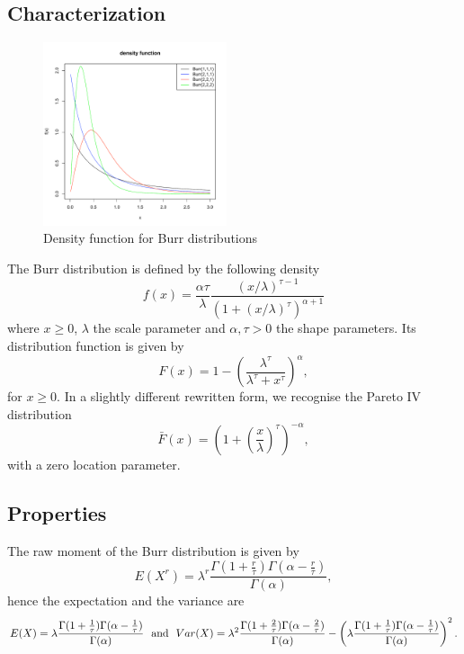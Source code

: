 \subsection{Characterization}
\begin{figure}
  \vspace{-40pt}
  \begin{center}
    \includegraphics[width=0.48\textwidth]{img/burrzoom}
  \end{center}
  \vspace{-20pt}  
  \caption{Density function for Burr distributions}
  \vspace{-20pt}  
\end{figure}
The Burr distribution is defined by the following density
$$
f(x) =\frac{\alpha\tau}{\lambda} \frac{  (x/\lambda)^{\tau-1}}{(1+(x/\lambda)^\tau)^{\alpha+1}}
$$
where $x\geq0$, $\lambda$ the scale parameter and $\alpha,\tau>0$ the shape parameters. 
Its distribution function is given by
$$
F(x) = 1-\left(\frac{\lambda^\tau}{\lambda^\tau+x^\tau}\right)^{\alpha},
$$
for $x\geq 0$.
In a slightly different rewritten form, we recognise the Pareto IV distribution
$$
\bar F(x) = \left(1+\left(\frac{x}{\lambda}\right)^\tau\right)^{-\alpha},
$$
with a zero location parameter.

\subsection{Properties}
The raw moment of the Burr distribution is given by 
$$
E(X^r) = \lambda^r\frac{\Gamma(1+\frac{r}{\tau})\Gamma(\alpha-\frac{r}{\tau})}{\Gamma(\alpha)},
$$
hence the expectation and the variance are 
$$
E(X) = \lambda\frac{\Gamma(1+\frac{1}{\tau})\Gamma(\alpha-\frac{1}{\tau})}{\Gamma(\alpha)} \textrm{~~and~~}
Var(X) = \lambda^2\frac{\Gamma(1+\frac{2}{\tau})\Gamma(\alpha-\frac{2}{\tau})}{\Gamma(\alpha)} -\left(\lambda\frac{\Gamma(1+\frac{1}{\tau})\Gamma(\alpha-\frac{1}{\tau})}{\Gamma(\alpha)}\right)^2.
$$

